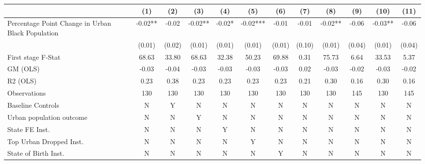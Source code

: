 \begin{tabular}{l*{11}{c}} \toprule
                    &\multicolumn{1}{c}{(1)}   &\multicolumn{1}{c}{(2)}   &\multicolumn{1}{c}{(3)}   &\multicolumn{1}{c}{(4)}   &\multicolumn{1}{c}{(5)}   &\multicolumn{1}{c}{(6)}   &\multicolumn{1}{c}{(7)}   &\multicolumn{1}{c}{(8)}   &\multicolumn{1}{c}{(9)}   &\multicolumn{1}{c}{(10)}   &\multicolumn{1}{c}{(11)}   \\
\midrule
Percentage Point Change in Urban Black Population&    -0.02** &    -0.02   &    -0.02** &    -0.02*  &    -0.02***&    -0.01   &    -0.01   &    -0.02** &    -0.06   &    -0.03** &    -0.06   \\
                    &   (0.01)   &   (0.02)   &   (0.01)   &   (0.01)   &   (0.01)   &   (0.01)   &   (0.10)   &   (0.01)   &   (0.04)   &   (0.01)   &   (0.04)   \\
\midrule
First stage F-Stat  &    68.63   &    33.80   &    68.63   &    32.38   &    50.23   &    69.88   &     0.31   &    75.73   &     6.64   &    33.53   &     5.37   \\
GM (OLS)            &    -0.03   &    -0.04   &    -0.03   &    -0.03   &    -0.03   &    -0.03   &     0.02   &    -0.03   &    -0.02   &    -0.03   &    -0.02   \\
R2 (OLS)            &     0.23   &     0.38   &     0.23   &     0.23   &     0.23   &     0.23   &     0.21   &     0.30   &     0.16   &     0.30   &     0.16   \\
Observations        &      130   &      130   &      130   &      130   &      130   &      130   &      130   &      130   &      145   &      130   &      145   \\
Baseline Controls   &        N   &        Y   &        N   &        N   &        N   &        N   &        N   &        N   &        N   &        N   &        N   \\
Urban population outcome&        N   &        N   &        Y   &        N   &        N   &        N   &        N   &        N   &        N   &        N   &        N   \\
State FE Inst.      &        N   &        N   &        N   &        Y   &        N   &        N   &        N   &        N   &        N   &        N   &        N   \\
Top Urban Dropped Inst.&        N   &        N   &        N   &        N   &        Y   &        N   &        N   &        N   &        N   &        N   &        N   \\
State of Birth Inst.&        N   &        N   &        N   &        N   &        N   &        Y   &        N   &        N   &        N   &        N   &        N   \\

\end{tabular}
